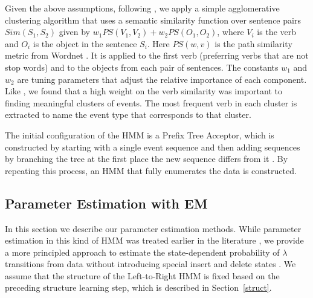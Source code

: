 \documentclass[letterpaper]{article}
\begin{document}
Given the above assumptions, following \cite{regneri2010learning}, we apply a simple agglomerative clustering algorithm that uses a semantic similarity function over sentence pairs  $Sim(S_1, S_2)$ given by $w_1 PS(V_1, V_2) + w_2 PS(O_1, O_2)$, where $V_i$ is the verb and $O_i$ is the object in the sentence $S_i$. Here $PS(w, v)$ is the path similarity metric from Wordnet \cite{miller1995wordnet}. It is applied to the first verb (preferring verbs that are not stop words) and to the objects from each pair of sentences.  The constants $w_1$ and $w_2$ are tuning parameters that adjust the relative importance of each component. Like \cite{regneri2010learning}, we found that a high weight on the verb similarity was important to finding meaningful clusters of events.  %
The most frequent verb in each cluster is extracted to name the event type that corresponds to that cluster. 

The initial configuration of the HMM is a Prefix Tree Acceptor,
which is constructed by starting with a single event 
sequence and then adding sequences by branching the tree
at the first place the new sequence differs from it
\cite{dupont1994search,seymore1999learning}.   %
By repeating this process, an HMM that fully enumerates the data is 
constructed.  %



\subsection{Parameter Estimation with EM} 
\vspace{-.05in}
\label{em}

In this section we describe our parameter estimation methods.  While parameter estimation in this kind of HMM was treated earlier in the literature \cite{rabiner,bahl}, we provide a more principled approach to estimate the state-dependent probability of $\lambda$ transitions from data without introducing special insert and delete states \cite{profileHMMs}. We assume that the structure of the Left-to-Right HMM is fixed based on the preceding structure learning step, which is described in Section~\ref{struct}.
\end{document}
